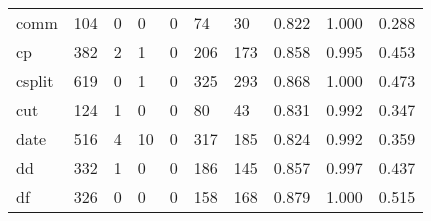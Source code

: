 \begin{longtable}{lp{1.3cm}p{1.3cm}p{1.3cm}p{1.3cm}p{1.3cm}p{1.3cm}p{1.3cm}p{1.3cm}p{1.3cm}}
comm      &                    104 &                                             0 &                                            0 &                                           0 &                                           74 &                                         30 &                                0.822 &                                  1.000 &                                0.288 \\
cp        &                    382 &                                             2 &                                            1 &                                           0 &                                          206 &                                        173 &                                0.858 &                                  0.995 &                                0.453 \\
csplit    &                    619 &                                             0 &                                            1 &                                           0 &                                          325 &                                        293 &                                0.868 &                                  1.000 &                                0.473 \\
cut       &                    124 &                                             1 &                                            0 &                                           0 &                                           80 &                                         43 &                                0.831 &                                  0.992 &                                0.347 \\
date      &                    516 &                                             4 &                                           10 &                                           0 &                                          317 &                                        185 &                                0.824 &                                  0.992 &                                0.359 \\
dd        &                    332 &                                             1 &                                            0 &                                           0 &                                          186 &                                        145 &                                0.857 &                                  0.997 &                                0.437 \\
df        &                    326 &                                             0 &                                            0 &                                           0 &                                          158 &                                        168 &                                0.879 &                                  1.000 &                                0.515 \\

\end{longtable}
